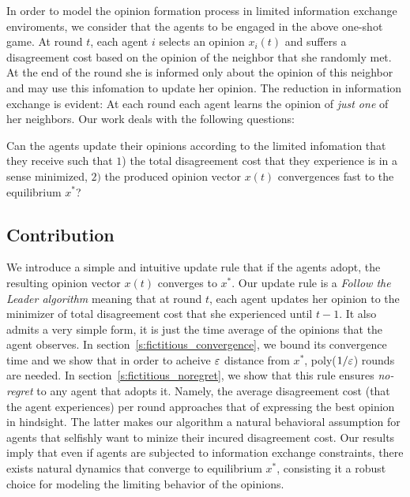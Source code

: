 In order to model the opinion formation process in limited information 
exchange enviroments, we consider that the agents to be engaged in the 
above one-shot game. At round $t$, each agent $i$ selects an opinion 
$x_i(t)$ and suffers a disagreement cost based on the opinion 
of the neighbor that she randomly met. At the end of the round she is 
informed only about the opinion of this neighbor and may use this infomation
to update her opinion. The reduction in information exchange is evident:
At each round each agent learns the opinion of \emph{just one} of her neighbors.
Our work deals with the following questions:
\begin{question}
Can the agents update their opinions according to the
limited infomation that they receive such that
$1$) the total disagreement cost that they experience is in a
sense minimized, $2)$ the produced opinion vector $x(t)$ convergences
fast to the equilibrium $x^*$?
\end{question}

\subsection{Contribution}
We introduce a simple and intuitive update rule that if the agents adopt,
the resulting opinion vector $x(t)$ converges to $x^*$.
Our update rule is a \emph{Follow the Leader algorithm}
meaning that at round $t$, each agent updates her opinion
to the minimizer of total disagreement cost that
she experienced until $t-1$. It also admits a very simple form,
it is just the time average of the opinions that the agent observes.
In section~\ref{s:fictitious_convergence},
we bound its convergence time and we show that in order
to acheive $\varepsilon$ distance from $x^*$, poly($1/\varepsilon$) rounds
are needed. In section~\ref{s:fictitious_noregret},
we show that this rule ensures \emph{no-regret} to any agent
that adopts it. Namely, the average disagreement cost (that
the agent experiences) per round approaches that
of expressing the best opinion in hindsight. The latter
makes our algorithm a natural behavioral assumption for
agents that selfishly want to minize their incured disagreement cost.
Our results imply that even if agents are subjected to  
information exchange constraints, there exists natural 
dynamics that converge to equilibrium $x^*$, consisting it 
a robust choice for modeling the limiting behavior of the opinions.


